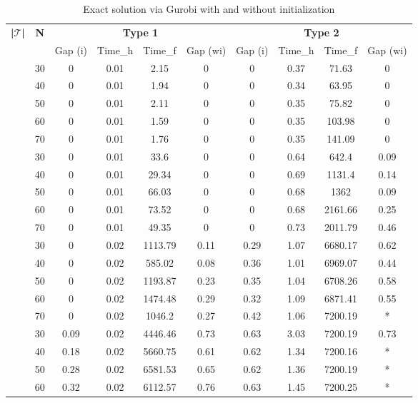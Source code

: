 \begin{table}[!h]
\caption{Exact solution via Gurobi with and without initialization}
\centering
\tiny
\begin{tabular}{|c|c|c c c c|c c c c|}
\hline
\multirow{2}{*}{\textbf{|$\mathcal{T}$|}} & \multirow{2}{*}{\textbf{N}} & \multicolumn{4}{|c|}{\textbf{Type 1}} & \multicolumn{4}{|c|}{\textbf{Type 2}}\\
& & Gap (i) & Time\_h  & Time\_f & Gap (wi) & Gap (i) & Time\_h  & Time\_f & Gap (wi)\\
\hline
\multirow{5}{*}{\midrule 5} & 30 & 0 &	0.01 &	2.15 &	0 &	0 &	0.37 &	71.63 &	0\\
& 40 & 0 &	0.01 &	1.94 &	0 &	0 &	0.34 &	63.95 &	0\\
& 50 & 0 &	0.01 &	2.11 &	0 &	0 &	0.35 &	75.82 &	0\\
& 60 & 0 &	0.01 &	1.59 &	0 &	0 &	0.35 &	103.98 &	0\\
& 70 & 0 &	0.01 &	1.76 &	0 &	0 &	0.35 &	141.09 &	0\\
\hline
\multirow{5}{*}{\midrule 6} & 30 & 0 &	0.01 &	33.6 &	0 &	0 &	0.64 &	642.4 &	0.09\\
& 40 & 0 &	0.01 &	29.34 &	0 &	0 &	0.69 &	1131.4 &	0.14\\
& 50 &	0 &	0.01 &	66.03 &	0 &	0 &	0.68 & 	1362 &	0.09\\
& 60 &	0 &	0.01 &	73.52 &	0 &	0 &	0.68 &	2161.66 &	0.25\\
& 70 &	0 &	0.01 &	49.35 &	0 &	0 &	0.73 &	2011.79 &	0.46\\
\hline
\multirow{5}{*}{\midrule 7} & 30 & 0 &	0.02 &	1113.79	& 0.11 &	0.29 &	1.07 &	6680.17 &	0.62\\
& 40 &	0 &	0.02 &	585.02	& 0.08 &	0.36 &	1.01 &	6969.07 &	0.44\\
& 50 & 0 &	0.02 &	1193.87 &	0.23 &	0.35 &	1.04 &	6708.26 &	0.58\\
& 60 &	0 &	0.02 &	1474.48 &	0.29 &	0.32 &	1.09 &	6871.41 &	0.55\\
& 70 &	0 &	0.02 &	1046.2 &	0.27 &	0.42 &	1.06 &	7200.19 &	*\\
\hline
\multirow{5}{*}{\midrule 8} & 30 &	0.09 &	0.02 &	4446.46 &	0.73 &	0.63 &	3.03 &	7200.19 &	0.73\\
& 40 &	0.18 &	0.02 &	5660.75 &	0.61 &	0.62 &	1.34 &	7200.16 &	*\\
& 50 &	0.28 &	0.02 &	6581.53 &	0.65 &	0.62 &	1.36 &	7200.19 &	*\\
& 60 &	0.32 &	0.02 &	6112.57	& 0.76 &	0.63 &	1.45 &	7200.25 &	*\\

\end{tabular}
\end{table}
